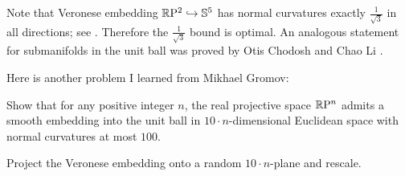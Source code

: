 Note that Veronese embedding $\mathbb{R}\mathrm{P}^2\hookrightarrow\mathbb{S}^5$ has normal curvatures exactly $\tfrac1{\sqrt{3}}$ in all directions; see \cite{petrunin-RPn}.
Therefore the $\tfrac1{\sqrt{3}}$ bound is optimal.
An analogous statement for submanifolds in the unit ball was proved by Otis Chodosh and Chao Li \cite{chodosh-li}.

Here is another problem I learned from Mikhael Gromov:

\begin{pr}
Show that for any positive integer $n$, the real projective space $\mathbb{R}\mathrm{P}^n$ admits a smooth embedding into the unit ball in $10\cdot n$-dimensional Euclidean space with normal curvatures at most $100$.
\end{pr}

 Project the Veronese embedding onto a random
$10\cdot n$-plane and rescale.
